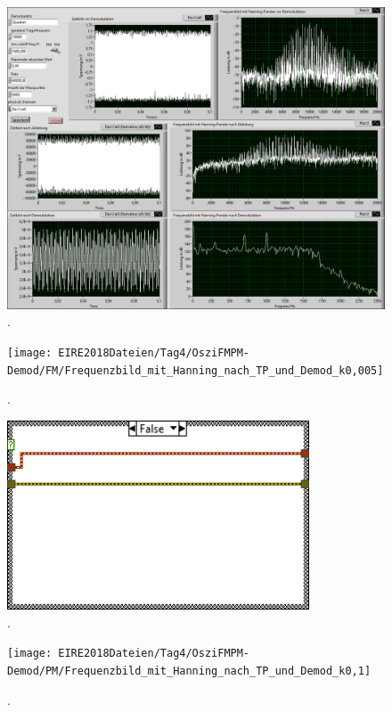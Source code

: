 \documentclass[
a4paper,
12pt,
pagesize,
ngerman
]{scrartcl}
\begin{document}
	\begin{figure}[H]
		\centering
		\includegraphics[width=1.0\textwidth]{EIRE2018Dateien/Tag4/OsziFMPM-Demod/FM/OsziPlusFMPMp}
		\caption{.}
	\end{figure}
	
	\begin{figure}[H] %
		\centering
		\texttt{[image: EIRE2018Dateien/Tag4/OsziFMPM-Demod/FM/Frequenzbild\_mit\_Hanning\_nach\_TP\_und\_Demod\_k0,005]}
		\caption{.}
	\end{figure}
	
	\begin{figure}[H]
		\centering
		\includegraphics[width=0.8\textwidth]{EIRE2018Dateien/Tag4/OsziFMPM-Demod/PM/OsziPlusFMPMd5} %
		\caption{.}
	\end{figure}
		
	\begin{figure}[H] %
		\centering
		\texttt{[image: EIRE2018Dateien/Tag4/OsziFMPM-Demod/PM/Frequenzbild\_mit\_Hanning\_nach\_TP\_und\_Demod\_k0,1]}
		\caption{.}
	\end{figure}
	
\end{document}
